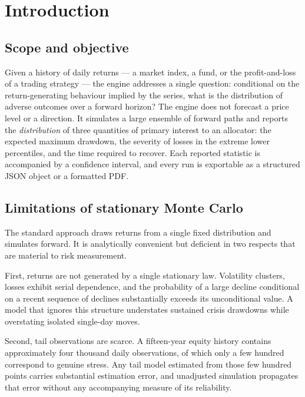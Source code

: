 \documentclass[11pt]{article}
\theoremstyle{definition}
\begin{document}
\clearpage
\tableofcontents
\clearpage

\section{Introduction}

\subsection{Scope and objective}
Given a history of daily returns --- a market index, a fund, or the profit-and-loss
of a trading strategy --- the engine addresses a single question: conditional on
the return-generating behaviour implied by the series, what is the distribution of
adverse outcomes over a forward horizon? The engine does not forecast a price level
or a direction. It simulates a large ensemble of forward paths and reports the
\emph{distribution} of three quantities of primary interest to an allocator: the
expected maximum drawdown, the severity of losses in the extreme lower percentiles,
and the time required to recover. Each reported statistic is accompanied by a
confidence interval, and every run is exportable as a structured JSON object or a
formatted PDF.

\subsection{Limitations of stationary Monte Carlo}
The standard approach draws returns from a single fixed distribution and simulates
forward. It is analytically convenient but deficient in two respects that are
material to risk measurement.

First, returns are not generated by a single stationary law. Volatility clusters,
losses exhibit serial dependence, and the probability of a large decline
conditional on a recent sequence of declines substantially exceeds its
unconditional value. A model that ignores this structure understates sustained
crisis drawdowns while overstating isolated single-day moves.

Second, tail observations are scarce. A fifteen-year equity history contains
approximately four thousand daily observations, of which only a few hundred
correspond to genuine stress. Any tail model estimated from those few hundred
points carries substantial estimation error, and unadjusted simulation propagates
that error without any accompanying measure of its reliability.
\end{document}
